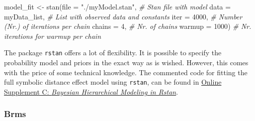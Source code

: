 \documentclass[
  english,
  doc,floatsintext]{apa6}
\newenvironment{Shaded}{\begin{snugshade}}{\end{snugshade}}
\newcommand{\AttributeTok}[1]{\textcolor[rgb]{0.77,0.63,0.00}{#1}}
\newcommand{\CommentTok}[1]{\textcolor[rgb]{0.56,0.35,0.01}{\textit{#1}}}
\newcommand{\DecValTok}[1]{\textcolor[rgb]{0.00,0.00,0.81}{#1}}
\newcommand{\FunctionTok}[1]{\textcolor[rgb]{0.00,0.00,0.00}{#1}}
\newcommand{\NormalTok}[1]{#1}
\newcommand{\OtherTok}[1]{\textcolor[rgb]{0.56,0.35,0.01}{#1}}
\newcommand{\StringTok}[1]{\textcolor[rgb]{0.31,0.60,0.02}{#1}}
\begin{document}
\begin{Shaded}
\begin{Highlighting}[]
\NormalTok{model\_fit }\OtherTok{\textless{}{-}} \FunctionTok{stan}\NormalTok{(}\AttributeTok{file =} \StringTok{"./myModel.stan"}\NormalTok{,  }\CommentTok{\# Stan file with model  }
                  \AttributeTok{data =}\NormalTok{ myData\_list,       }\CommentTok{\# List with observed data and constants}
                  \AttributeTok{iter =} \DecValTok{4000}\NormalTok{,              }\CommentTok{\# Number (Nr.) of iterations per chain}
                  \AttributeTok{chains =} \DecValTok{4}\NormalTok{,               }\CommentTok{\# Nr. of chains }
                  \AttributeTok{warmup =} \DecValTok{1000}\NormalTok{)            }\CommentTok{\# Nr. iterations for warmup per chain}
\end{Highlighting}
\end{Shaded}

\normalsize

The package \texttt{rstan} offers a lot of flexibility. It is possible to specify the probability model and priors in the exact way as is wished. However, this comes with the price of some technical knowledge. The commented code for fitting the full symbolic distance effect model using \texttt{rstan}, can be found in \href{https://github.com/MyrtheV/Bayesian-Hierarchical-Modelling-An-Introduction-and-Reassessment/blob/main/C\%20-\%20Tutorial\%20Normal\%20Model\%20Rstan/Online-Supplement-C---Bayesian-Hierarchical-Modeling-in-rstan.pdf}{Online Supplement C: \emph{Bayesian Hierarchical Modeling in Rstan}}.

\hypertarget{brms}{%
\subsubsection{Brms}\label{brms}}
\end{document}
